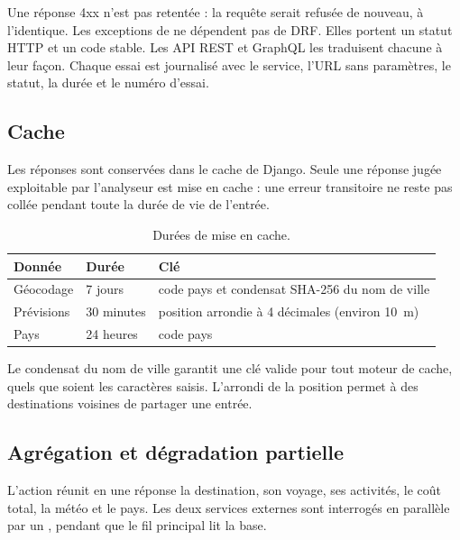 Une réponse 4xx n'est pas retentée : la requête serait refusée de nouveau, à l'identique. Les exceptions de  ne dépendent pas de DRF. Elles portent un statut HTTP et un code stable. Les API REST et GraphQL les traduisent chacune à leur façon. Chaque essai est journalisé avec le service, l'URL sans paramètres, le statut, la durée et le numéro d'essai.

\subsection{Cache}

Les réponses sont conservées dans le cache de Django. Seule une réponse jugée exploitable par l'analyseur est mise en cache : une erreur transitoire ne reste pas \og{}collée\fg{} pendant toute la durée de vie de l'entrée.

\begin{table}[H]
  \centering
  \small
  \caption{Durées de mise en cache.}
  \label{tab:cache}
  \begin{tabularx}{\linewidth}{@{}l l X@{}}
    \toprule
    \textbf{Donnée} & \textbf{Durée} & \textbf{Clé} \\
    \midrule
    Géocodage & 7 jours & code pays et condensat SHA-256 du nom de ville \\
    Prévisions & 30 minutes & position arrondie à 4 décimales (environ 10~m) \\
    Pays & 24 heures & code pays \\
    \bottomrule
  \end{tabularx}
\end{table}

Le condensat du nom de ville garantit une clé valide pour tout moteur de cache, quels que soient les caractères saisis. L'arrondi de la position permet à des destinations voisines de partager une entrée.

\subsection{Agrégation et dégradation partielle}

L'action  réunit en une réponse la destination, son voyage, ses activités, le coût total, la météo et le pays. Les deux services externes sont interrogés en parallèle par un , pendant que le fil principal lit la base.

